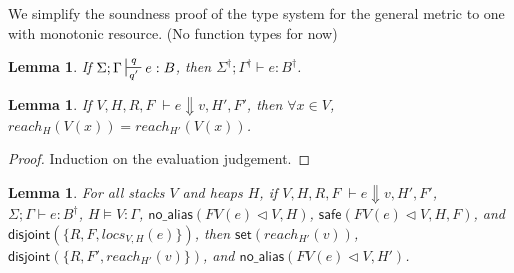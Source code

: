 \documentclass[11pt]{article}
\newcommand{\ms}[1]{\ensuremath{\mathsf{#1}}}
\newcommand{\na}[1]{\mathsf{no\_alias}(#1)}
\newcommand{\safe}[1]{\mathsf{safe}(#1)}
\newcommand{\dist}[1]{\mathsf{disjoint}(#1)}
\newtheorem{lemma}[theorem]{Lemma}
\begin{document}
We simplify the soundness proof of the type system for the general metric to one with monotonic resource.
(No function types for now)

\begin{lemma}
\label{a} If $\Sigma; \Gamma \sststile{q'}{q} e : B$, then $\Sigma^{\dagger}; \Gamma^{\dagger} \vdash e : B^{\dagger}$.
\end{lemma}

\begin{lemma}
If $V,H,R,F \; \vdash e \Downarrow v, H', F'$, then $\forall x \in V$, $reach_H(V(x)) = reach_{H'}(V(x))$.
\end{lemma}
\begin{proof}
Induction on the evaluation judgement.
\end{proof}


\begin{lemma}
For all stacks $V$ and heaps $H$, if  $V,H,R,F \; \vdash e \Downarrow v, H', F'$, $\Sigma; \Gamma \vdash e : B^{\dagger}$, $H \vDash V : \Gamma$, $\na{FV(e) \lhd V,H}$, $\safe{FV(e) \lhd V,H,F}$, and $\dist{\{R,F,locs_{V,H}(e)\}}$, then $\ms{set}(reach_{H'}(v))$, $\dist{\{R,F',reach_{H'}(v)\}}$, and $\na{FV(e) \lhd V,H'}$.
\end{lemma}
\end{document}
